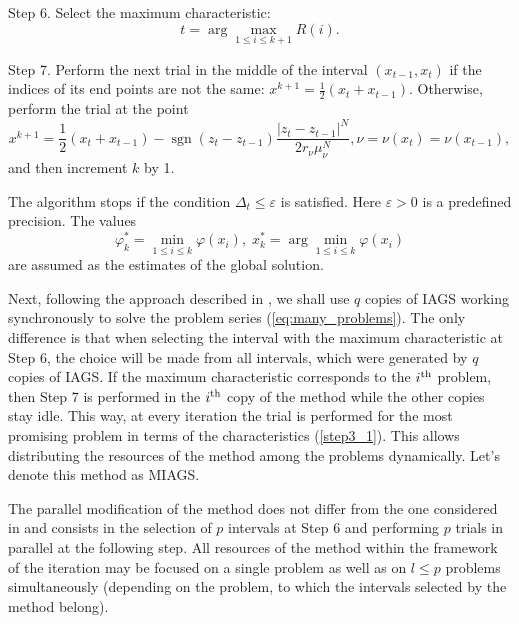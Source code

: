 \documentclass[runningheads]{llncs}
\begin{document}
Step 6. Select the maximum characteristic:
\begin{equation}
\label{step4}
t=\arg \max_{1\leqslant i \leqslant k+1}R(i).
\end{equation}

Step 7. Perform the next trial in the middle of the interval \((x_{t-1},x_{t})\) if the indices of its
end points are not the same: \(x^{k+1}={\frac {1}{2}}(x_{t}+x_{t-1})\).
Otherwise, perform the trial at the point
\begin{displaymath}
  x^{k+1}={\frac {1}{2}}(x_{t}+x_{t-1})-\operatorname {sgn}(z_{t}-z_{t-1}){\frac {|z_{t}-
z_{t-1}|^{N}}{2r_{\nu }\mu _{\nu }^{N}}},\nu =\nu (x_{t})=\nu (x_{t-1}),
\end{displaymath}
and then increment \(k\) by 1.

The algorithm stops if the condition \(\Delta_{t}\leqslant \varepsilon\) is satisfied. Here
\(\varepsilon>0\) is a predefined precision.
The values
\begin{equation}
\varphi_k^*=\min_{1\leqslant i \leqslant k}\varphi(x_i), \; x_k^*=\arg \min_{1\leqslant i \leqslant
k}\varphi(x_i)
\end{equation}
are assumed as the estimates of the global solution.

Next, following the approach described in \cite{BarkalovStrongin2018}, we shall use \(q\) copies
of IAGS working synchronously to solve the problem series (\ref{eq:many_problems}).
The only difference is that when selecting the interval with the maximum characteristic at Step
6, the choice will be made from all intervals, which were generated by \(q\) copies of IAGS.
If the maximum characteristic corresponds to the \(i^{\rm th}\) problem, then Step 7 is
performed in the \(i^{\rm th}\) copy of the method while the other copies stay idle.
This way, at every iteration the trial is performed for the most promising problem in terms of the characteristics (\ref{step3_1}). This allows distributing the resources of the
method among the problems dynamically. Let's denote this method as MIAGS.

The parallel modification of the method does not differ from the one considered in
\cite{BarkalovStrongin2018} and consists in the selection of \(p\) intervals at Step 6 and
performing  \(p\) trials in parallel at the following step.
All resources of the method within the framework of the iteration may be focused on
a single problem as well as on \(l\leqslant p\) problems simultaneously (depending on the problem,
to which the intervals selected by the method belong).
\end{document}
